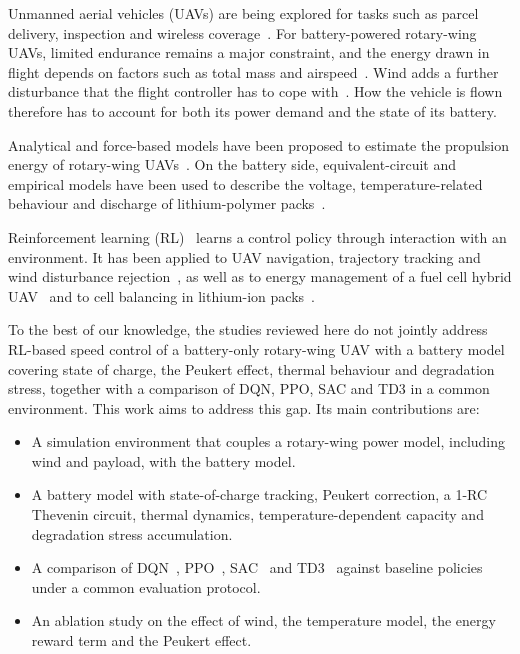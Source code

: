 Unmanned aerial vehicles (UAVs) are being explored for tasks such as parcel delivery, inspection and wireless coverage~\cite{li2024energy,zhang2026edsac,liu2020distributed}. For battery-powered rotary-wing UAVs, limited endurance remains a major constraint, and the energy drawn in flight depends on factors such as total mass and airspeed~\cite{li2024energy}. Wind adds a further disturbance that the flight controller has to cope with~\cite{ma2024wind}. How the vehicle is flown therefore has to account for both its power demand and the state of its battery.

Analytical and force-based models have been proposed to estimate the propulsion energy of rotary-wing UAVs~\cite{yan2021new,li2024energy}. On the battery side, equivalent-circuit and empirical models have been used to describe the voltage, temperature-related behaviour and discharge of lithium-polymer packs~\cite{suti2022thevenin,dinisio2023battery,agostini2024simplified}.

Reinforcement learning (RL)~\cite{sutton2018rl} learns a control policy through interaction with an environment. It has been applied to UAV navigation, trajectory tracking and wind disturbance rejection~\cite{liu2020distributed,zhang2026edsac,ma2024wind}, as well as to energy management of a fuel cell hybrid UAV~\cite{gao2023healthaware} and to cell balancing in lithium-ion packs~\cite{tavakol2024reinforcement}.

To the best of our knowledge, the studies reviewed here do not jointly address RL-based speed control of a battery-only rotary-wing UAV with a battery model covering state of charge, the Peukert effect, thermal behaviour and degradation stress, together with a comparison of DQN, PPO, SAC and TD3 in a common environment. This work aims to address this gap. Its main contributions are:
\begin{itemize}
  \item A simulation environment that couples a rotary-wing power model, including wind and payload, with the battery model.
  \item A battery model with state-of-charge tracking, Peukert correction, a 1-RC Thevenin circuit, thermal dynamics, temperature-dependent capacity and degradation stress accumulation.
  \item A comparison of DQN~\cite{mnih2015dqn}, PPO~\cite{schulman2017ppo}, SAC~\cite{haarnoja2018sac} and TD3~\cite{fujimoto2018td3} against baseline policies under a common evaluation protocol.
  \item An ablation study on the effect of wind, the temperature model, the energy reward term and the Peukert effect.
\end{itemize}
